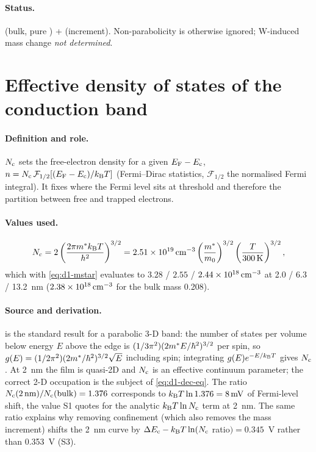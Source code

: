 \paragraph{Status.}
 (bulk, pure \InO{}) +  (increment).
Non-parabolicity is otherwise ignored; W-induced mass change \emph{not determined}.

\section{Effective density of states of the conduction band}
\label{sec:par-nc}

\paragraph{Definition and role.}
$N_{\mathrm{c}}$ sets the free-electron density for a given $E_{\mathrm{F}} - E_{\mathrm{c}}$,
$n = N_{\mathrm{c}}\,\mathcal{F}_{1/2}[(E_{\mathrm{F}}-E_{\mathrm{c}})/k_{\mathrm{B}}T]$ (Fermi--Dirac statistics, $\mathcal{F}_{1/2}$ the normalised
Fermi integral). It fixes where the Fermi level sits at threshold and therefore the partition between free
and trapped electrons.

\paragraph{Values used.}
\begin{equation}
  N_{\mathrm{c}} = 2\left(\frac{2\pi m^{*}k_{\mathrm{B}}T}{h^2}\right)^{3/2}
      = \SI{2.51e19}{cm^{-3}}\left(\frac{m^{*}}{m_0}\right)^{3/2}\left(\frac{T}{\SI{300}{K}}\right)^{3/2},
  \label{eq:d1-nc}
\end{equation}
which with \cref{eq:d1-mstar} evaluates to $3.28$ / $2.55$ / $2.44\times10^{18}\,\mathrm{cm}^{-3}$ at 2.0 / 6.3 / 13.2~nm
($2.38\times10^{18}\,\mathrm{cm}^{-3}$ for the bulk mass 0.208).

\paragraph{Source and derivation.}
 is the standard result for a parabolic 3-D band: the number of states per volume below
energy $E$ above the edge is $(1/3\pi^2)(2m^{*} E/\hbar^2)^{3/2}$ per spin, so $g(E) = (1/2\pi^2)(2m^{*}/\hbar^2)^{3/2}\sqrt{E}$
including spin; integrating $g(E)e^{-E/k_{\mathrm{B}}T}$ gives $N_{\mathrm{c}}$. At 2~nm the film is quasi-2D and $N_{\mathrm{c}}$ is an
effective continuum parameter; the correct 2-D occupation is the subject of \cref{eq:d1-dec-eq}. The ratio
$N_{\mathrm{c}}(2\,\mathrm{nm})/N_{\mathrm{c}}(\mathrm{bulk}) = 1.376$ corresponds to $k_{\mathrm{B}}T\ln 1.376 = \SI{8}{mV}$ of Fermi-level shift, the
value S1 quotes for the analytic $k_{\mathrm{B}}T\ln N_{\mathrm{c}}$ term at 2~nm. The same ratio explains why removing confinement
(which also removes the mass increment) shifts the 2~nm curve by $\Delta E_{\mathrm{c}} - k_{\mathrm{B}}T\ln(N_{\mathrm{c}}$ ratio$) = 0.345$~V rather
than 0.353~V (S3).

